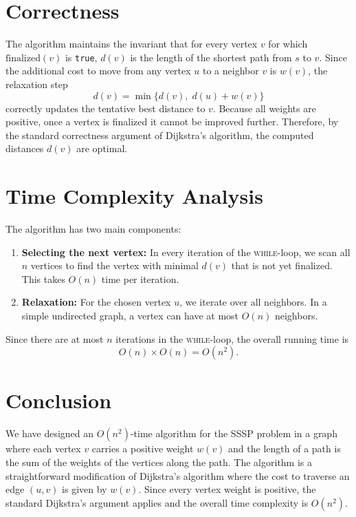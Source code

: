 \documentclass[letterpaper, 11pt]{article}
\newcommand{\1}{\mathds{1}}	%
\theoremstyle{definition}
\newenvironment{solution}{{\par\noindent\it Solution.}}{}
\begin{document}
\begin{solution}
\section*{Correctness}
The algorithm maintains the invariant that for every vertex \(v\) for which \(\text{finalized}(v)\) is \texttt{true}, \(d(v)\) is the length of the shortest path from \(s\) to \(v\). Since the additional cost to move from any vertex \(u\) to a neighbor \(v\) is \(w(v)\), the relaxation step 
\[
d(v) = \min\{ d(v), \; d(u) + w(v) \}
\]
correctly updates the tentative best distance to \(v\). Because all weights are positive, once a vertex is finalized it cannot be improved further. Therefore, by the standard correctness argument of Dijkstra’s algorithm, the computed distances \(d(v)\) are optimal.

\section*{Time Complexity Analysis}
The algorithm has two main components:
\begin{enumerate}
    \item \textbf{Selecting the next vertex:} In every iteration of the \textsc{while}-loop, we scan all \(n\) vertices to find the vertex with minimal \(d(v)\) that is not yet finalized. This takes \(O(n)\) time per iteration.
    \item \textbf{Relaxation:} For the chosen vertex \(u\), we iterate over all neighbors. In a simple undirected graph, a vertex can have at most \(O(n)\) neighbors.
\end{enumerate}
Since there are at most \(n\) iterations in the \textsc{while}-loop, the overall running time is
\[
O(n) \times O(n) = O(n^2).
\]

\section*{Conclusion}
We have designed an \(O(n^2)\)-time algorithm for the SSSP problem in a graph where each vertex \(v\) carries a positive weight \(w(v)\) and the length of a path is the sum of the weights of the vertices along the path. The algorithm is a straightforward modification of Dijkstra's algorithm where the cost to traverse an edge \((u,v)\) is given by \(w(v)\). Since every vertex weight is positive, the standard Dijkstra’s argument applies and the overall time complexity is \(O(n^2)\).
\end{solution}
\clearpage
\end{document}
